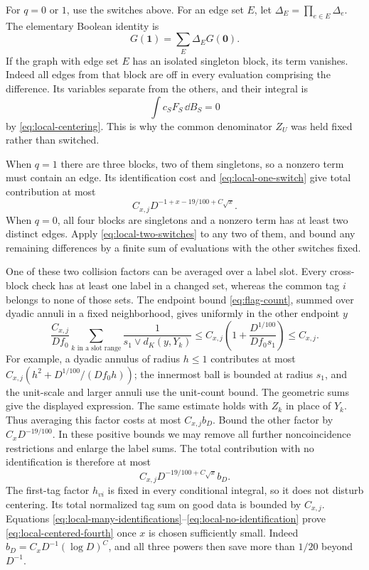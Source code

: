 For $q=0$ or $1$, use the switches above.  For an edge set $E$, let
$\Delta_E=\prod_{e\in E}\Delta_e$.  The elementary Boolean identity is
\begin{equation}\label{eq:local-boolean}
                   G(\boldsymbol1)=\sum_E\Delta_EG(\boldsymbol0).
\end{equation}
If the graph with edge set $E$ has an isolated singleton block, its
term vanishes.  Indeed all edges from that block are off in every
evaluation comprising the difference.  Its variables separate from
the others, and their integral is
\[
                       \int c_S F_S\,\dd B_S=0
\]
by \eqref{eq:local-centering}.  This is why the common denominator
$Z_U$ was held fixed rather than switched.

When $q=1$ there are three blocks, two of them singletons, so a
nonzero term must contain an edge.  Its identification cost and
\eqref{eq:local-one-switch} give total contribution at most
\begin{equation}\label{eq:local-one-identification}
                    C_{x,j}D^{-1+x-19/100+C\sqrt x}.
\end{equation}
When $q=0$, all four blocks are singletons and a nonzero term has
at least two distinct edges.  Apply \eqref{eq:local-two-switches}
to any two of them, and bound any remaining differences by a finite
sum of evaluations with the other switches fixed.

One of these two collision factors can be averaged over a label
slot.  Every cross-block check has at least one label in a changed
set, whereas the common tag $i$ belongs to none of those sets.
The endpoint bound \eqref{eq:flag-count}, summed over dyadic annuli
in a fixed neighborhood, gives uniformly in the other endpoint $y$
\begin{equation}\label{eq:label-average}
 \frac{C_{x,j}}{Df_0}
       \sum_{k\text{ in a slot range}}
                 \frac1{s_1\vee d_K(y,Y_k)}
 \le C_{x,j}\left(1+\frac{D^{1/100}}{Df_0s_1}\right)
 \le C_{x,j}.
\end{equation}
For example, a dyadic annulus of radius $h\le1$ contributes at most
$C_{x,j}(h^2+D^{1/100}/(Df_0h))$; the innermost ball is bounded at
radius $s_1$, and the unit-scale and larger annuli use the unit-count
bound.  The geometric sums give the displayed expression.  The same
estimate holds with $Z_k$ in place of $Y_k$.  Thus averaging this
factor costs at most $C_{x,j}b_D$.  Bound the other factor by
$C_xD^{-19/100}$.  In these positive bounds we may remove all further
noncoincidence restrictions and enlarge the label sums.  The total
contribution with no identification is therefore at most
\begin{equation}\label{eq:local-no-identification}
                    C_{x,j}D^{-19/100+C\sqrt x}b_D.
\end{equation}
The first-tag factor $h_{vi}$ is fixed in every conditional integral,
so it does not disturb centering.  Its total normalized tag sum on
good data is bounded by $C_{x,j}$.  Equations
\eqref{eq:local-many-identifications}--\eqref{eq:local-no-identification}
prove \eqref{eq:local-centered-fourth} once $x$ is chosen sufficiently
small.  Indeed $b_D=C_xD^{-1}(\log D)^C$, and all three powers then
save more than $1/20$ beyond $D^{-1}$.


